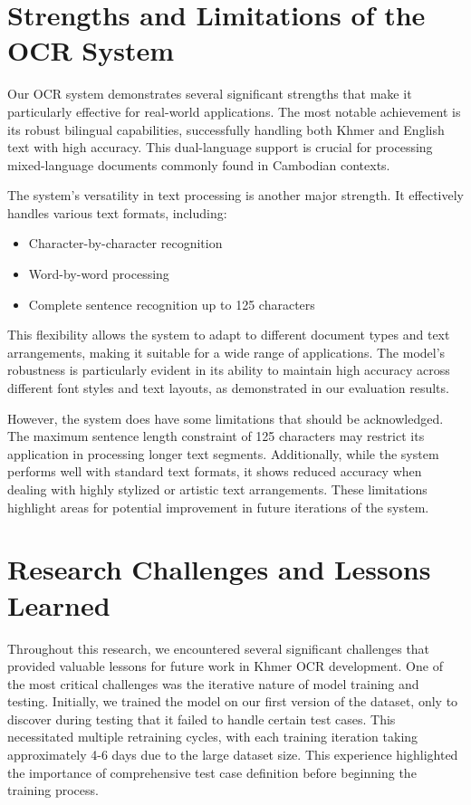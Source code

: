 {\section{Strengths and Limitations of the OCR System}
\label{sec:strengths}

Our OCR system demonstrates several significant strengths that make it particularly effective for real-world 
applications. The most notable achievement is its robust bilingual capabilities, successfully handling both Khmer 
and English text with high accuracy. This dual-language support is crucial for processing mixed-language documents 
commonly found in Cambodian contexts.

The system's versatility in text processing is another major strength. It effectively handles various text formats, including:
\begin{itemize}
    \item Character-by-character recognition
    \item Word-by-word processing
    \item Complete sentence recognition up to 125 characters
\end{itemize}

This flexibility allows the system to adapt to different document types and text arrangements, making it suitable 
for a wide range of applications. The model's robustness is particularly evident in its ability to maintain high 
accuracy across different font styles and text layouts, as demonstrated in our evaluation results.

However, the system does have some limitations that should be acknowledged. The maximum sentence length constraint 
of 125 characters may restrict its application in processing longer text segments. Additionally, while the system 
performs well with standard text formats, it shows reduced accuracy when dealing with highly stylized or artistic 
text arrangements. These limitations highlight areas for potential improvement in future iterations of the system.


\section{Research Challenges and Lessons Learned}
\label{sec:challenges}

Throughout this research, we encountered several significant challenges that provided valuable lessons 
for future work in Khmer OCR development. One of the most critical challenges was the iterative nature of 
model training and testing. Initially, we trained the model on our first version of the dataset, only to 
discover during testing that it failed to handle certain test cases. This necessitated multiple retraining cycles, 
with each training iteration taking approximately 4-6 days due to the large dataset size. This experience 
highlighted the importance of comprehensive test case definition before beginning the training process.

}
